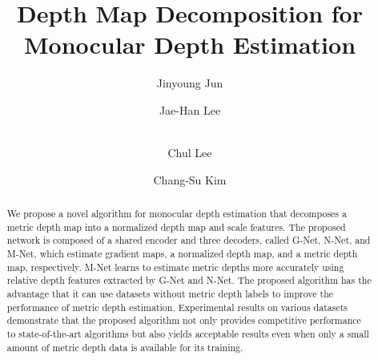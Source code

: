 \documentclass[runningheads]{llncs}
\begin{document}
\pagestyle{headings}
\mainmatter
\def\ECCVSubNumber{4247}  

\title{Depth Map Decomposition for Monocular Depth Estimation}

\begin{comment}
\titlerunning{ECCV-22 submission ID \ECCVSubNumber}
\authorrunning{ECCV-22 submission ID \ECCVSubNumber}
\author{Anonymous ECCV submission}
\institute{Paper ID \ECCVSubNumber}
\end{comment}


\author{Jinyoung Jun \and
Jae-Han Lee \and \\
Chul Lee \and
Chang-Su Kim}


\maketitle

\begin{abstract}
We propose a novel algorithm for monocular depth estimation that decomposes a metric depth map into a normalized depth map and scale features. The proposed network is composed of a shared encoder and three decoders, called G-Net, N-Net, and M-Net, which estimate gradient maps, a normalized depth map, and a metric depth map, respectively. M-Net learns to estimate metric depths more accurately using relative depth features extracted by G-Net and N-Net. The proposed algorithm has the advantage that it can use datasets without metric depth labels to improve the performance of metric depth estimation. Experimental results on various datasets demonstrate that the proposed algorithm not only provides competitive performance to state-of-the-art algorithms but also yields acceptable results even when only a small amount of metric depth data is available for its training.

\end{abstract}
\end{document}
